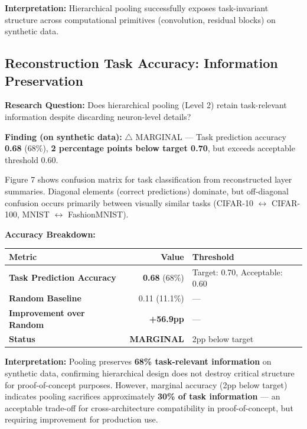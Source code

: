 \textbf{Interpretation:} Hierarchical pooling successfully exposes task-invariant structure across computational primitives (convolution, residual blocks) on synthetic data.

\subsection{Reconstruction Task Accuracy: Information Preservation}

\textbf{Research Question:} Does hierarchical pooling (Level 2) retain task-relevant information despite discarding neuron-level details?

\textbf{Finding (on synthetic data):} $\triangle$ MARGINAL --- Task prediction accuracy \textbf{0.68} (68\%), \textbf{2 percentage points below target 0.70}, but exceeds acceptable threshold 0.60.

Figure 7 shows confusion matrix for task classification from reconstructed layer summaries. Diagonal elements (correct predictions) dominate, but off-diagonal confusion occurs primarily between visually similar tasks (CIFAR-10 $\leftrightarrow$ CIFAR-100, MNIST $\leftrightarrow$ FashionMNIST).

\textbf{Accuracy Breakdown:}

\begin{table}[h]
\centering
\begin{tabular}{lrl}
\toprule
\textbf{Metric} & \textbf{Value} & \textbf{Threshold} \\
\midrule
\textbf{Task Prediction Accuracy} & \textbf{0.68} (68\%) & Target: 0.70, Acceptable: 0.60 \\
\textbf{Random Baseline} & 0.11 (11.1\%) & --- \\
\textbf{Improvement over Random} & \textbf{+56.9pp} & --- \\
\textbf{Status} & \textbf{MARGINAL} & 2pp below target \\
\bottomrule
\end{tabular}
\end{table}

\textbf{Interpretation:} Pooling preserves \textbf{68\% task-relevant information} on synthetic data, confirming hierarchical design does not destroy critical structure for proof-of-concept purposes. However, marginal accuracy (2pp below target) indicates pooling sacrifices approximately \textbf{30\% of task information} --- an acceptable trade-off for cross-architecture compatibility in proof-of-concept, but requiring improvement for production use.

